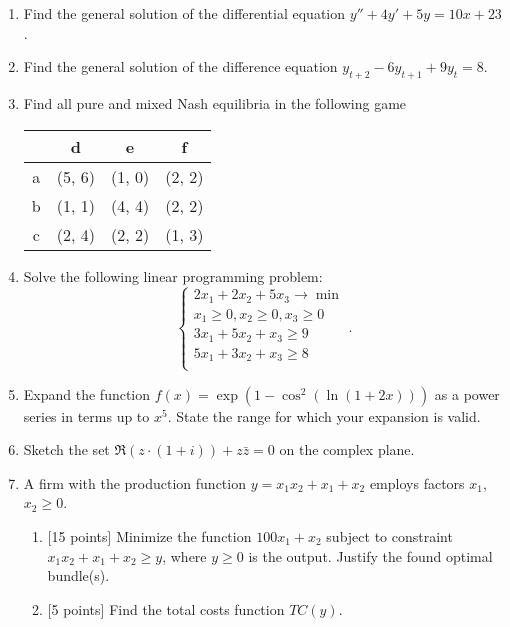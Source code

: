\begin{enumerate}
\item Find the general solution of the differential equation $y'' + 4y' + 5y = 10x+23$.
\item Find the general solution of the difference equation $y_{t+2} - 6y_{t+1} + 9y_t = 8$.
\item Find all pure and mixed Nash equilibria in the following game

\begin{center}
\begin{tabular}{@{}cccc@{}}
\toprule
  & d & e & f \\ \midrule
a & (5, 6) & (1, 0)  & (2, 2)   \\
b & (1, 1) & (4, 4) & (2, 2)   \\
c & (2, 4) & (2, 2) & (1, 3)   \\ \bottomrule
\end{tabular}
\end{center}

\item Solve the following linear programming problem:
\[
\begin{cases}
2x_1 + 2x_2 + 5x_3 \to \min \\
x_1 \geq 0, x_2 \geq 0, x_3 \geq 0 \\
3x_1 + 5x_2 + x_3 \geq 9 \\
5x_1 + 3x_2 + x_3 \geq 8 \\
\end{cases}.
\]

\item Expand the function $f(x) = \exp(1 - \cos^2 (\ln(1 + 2x)))$ as a power series in terms up to $x^5$.
  State the range for which your expansion is valid.

\item Sketch the set $\Re(z\cdot (1+i))+z\bar z =0$ on the complex plane.

\item A firm with the production function $y=x_1x_2+x_1+x_2$ employs factors $x_1$, $x_2 \geq 0$.
	  \begin{enumerate}[label=\alph*)]
	    \item {[15 points]} Minimize the function $100x_1+x_2$  subject to constraint  $x_1x_2+x_1+x_2 \geq y$, where  $y\geq 0$ is the output.
	      Justify the found optimal bundle(s).
	    \item {[5 points]} Find the total costs function  $TC(y)$.
	  \end{enumerate}


\end{enumerate}
